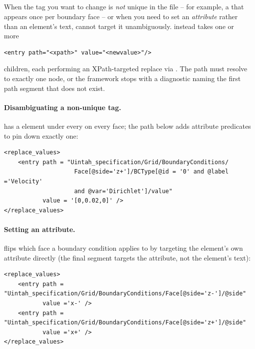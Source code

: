 \subsection{}
\label{Sec:PS-ReplaceValues}

When the tag you want to change is \emph{not} unique in the file -- for example, a 
that appears once per boundary face -- or when you need to set an \emph{attribute} rather than an
element's text,  cannot target it unambiguously. 
instead takes one or more

{\footnotesize
\begin{verbatim}
<entry path="<xpath>" value="<newvalue>"/>
\end{verbatim}
}

children, each performing an XPath-targeted replace via . The path must resolve to
exactly one node, or the framework stops with a diagnostic naming the first path segment that does
not exist.

\paragraph{Disambiguating a non-unique tag.}  has a
 element under every  on every face; the path below adds attribute
predicates to pin down exactly one:

{\footnotesize
\begin{verbatim}
<replace_values>
    <entry path = "Uintah_specification/Grid/BoundaryConditions/
                    Face[@side='z+']/BCType[@id = '0' and @label ='Velocity'
                    and @var='Dirichlet']/value"
           value = '[0,0.02,0]' />
</replace_values>
\end{verbatim}
}

\paragraph{Setting an attribute.}  flips which face a boundary
condition applies to by targeting the  element's own  attribute directly (the
final  segment targets the attribute, not the element's text):

{\footnotesize
\begin{verbatim}
<replace_values>
    <entry path = "Uintah_specification/Grid/BoundaryConditions/Face[@side='z-']/@side"
           value ='x-' />
    <entry path = "Uintah_specification/Grid/BoundaryConditions/Face[@side='z+']/@side"
           value ='x+' />
</replace_values>
\end{verbatim}
}

